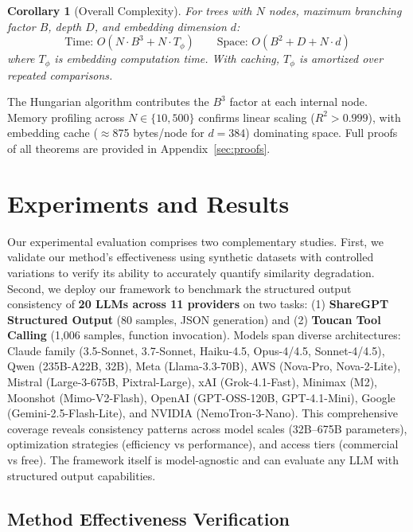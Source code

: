 \documentclass{article}
\newtheorem{corollary}[theorem]{Corollary}
\begin{document}
\begin{corollary}[Overall Complexity]
\label{cor:complexity}
For trees with $N$ nodes, maximum branching factor $B$, depth $D$, and embedding dimension $d$:
\vspace{-2mm}
\begin{equation}
    \text{Time: } O(N \cdot B^3 + N \cdot T_\phi) \qquad \text{Space: } O(B^2 + D + N \cdot d)
\end{equation}
where $T_\phi$ is embedding computation time. With caching, $T_\phi$ is amortized over repeated comparisons.
\end{corollary}
\vspace{-1mm}
\noindent The Hungarian algorithm contributes the $B^3$ factor at each internal node. Memory profiling across $N \in \{10, 500\}$ confirms linear scaling ($R^2 > 0.999$), with embedding cache ($\approx$875 bytes/node for $d=384$) dominating space. Full proofs of all theorems are provided in Appendix~\ref{sec:proofs}.

\section{Experiments and Results}
\vspace{-2mm}
Our experimental evaluation comprises two complementary studies. First, we validate our method's effectiveness using synthetic datasets with controlled variations to verify its ability to accurately quantify similarity degradation. Second, we deploy our framework to benchmark the structured output consistency of \textbf{20 LLMs across 11 providers} on two tasks: (1) \textbf{ShareGPT Structured Output} (80 samples, JSON generation) and (2) \textbf{Toucan Tool Calling} (1,006 samples, function invocation). Models span diverse architectures: Claude family (3.5-Sonnet, 3.7-Sonnet, Haiku-4.5, Opus-4/4.5, Sonnet-4/4.5), Qwen (235B-A22B, 32B), Meta (Llama-3.3-70B), AWS (Nova-Pro, Nova-2-Lite), Mistral (Large-3-675B, Pixtral-Large), xAI (Grok-4.1-Fast), Minimax (M2), Moonshot (Mimo-V2-Flash), OpenAI (GPT-OSS-120B, GPT-4.1-Mini), Google (Gemini-2.5-Flash-Lite), and NVIDIA (NemoTron-3-Nano). This comprehensive coverage reveals consistency patterns across model scales (32B--675B parameters), optimization strategies (efficiency vs performance), and access tiers (commercial vs free). The framework itself is model-agnostic and can evaluate any LLM with structured output capabilities.

\subsection{Method Effectiveness Verification}
\end{document}
